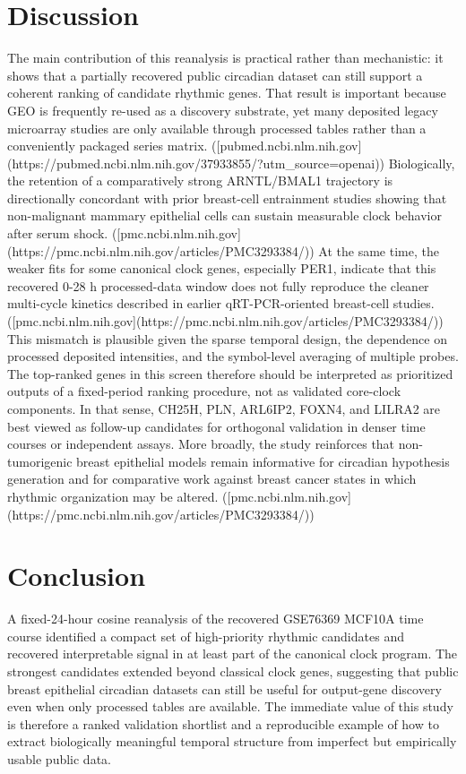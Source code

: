 \documentclass[11pt]{article}
\begin{document}
\section{Discussion}
The main contribution of this reanalysis is practical rather than mechanistic: it shows that a partially recovered public circadian dataset can still support a coherent ranking of candidate rhythmic genes. That result is important because GEO is frequently re-used as a discovery substrate, yet many deposited legacy microarray studies are only available through processed tables rather than a conveniently packaged series matrix. ([pubmed.ncbi.nlm.nih.gov](https://pubmed.ncbi.nlm.nih.gov/37933855/?utm\_source=openai)) Biologically, the retention of a comparatively strong ARNTL/BMAL1 trajectory is directionally concordant with prior breast-cell entrainment studies showing that non-malignant mammary epithelial cells can sustain measurable clock behavior after serum shock. ([pmc.ncbi.nlm.nih.gov](https://pmc.ncbi.nlm.nih.gov/articles/PMC3293384/)) At the same time, the weaker fits for some canonical clock genes, especially PER1, indicate that this recovered 0-28 h processed-data window does not fully reproduce the cleaner multi-cycle kinetics described in earlier qRT-PCR-oriented breast-cell studies. ([pmc.ncbi.nlm.nih.gov](https://pmc.ncbi.nlm.nih.gov/articles/PMC3293384/)) This mismatch is plausible given the sparse temporal design, the dependence on processed deposited intensities, and the symbol-level averaging of multiple probes. The top-ranked genes in this screen therefore should be interpreted as prioritized outputs of a fixed-period ranking procedure, not as validated core-clock components. In that sense, CH25H, PLN, ARL6IP2, FOXN4, and LILRA2 are best viewed as follow-up candidates for orthogonal validation in denser time courses or independent assays. More broadly, the study reinforces that non-tumorigenic breast epithelial models remain informative for circadian hypothesis generation and for comparative work against breast cancer states in which rhythmic organization may be altered. ([pmc.ncbi.nlm.nih.gov](https://pmc.ncbi.nlm.nih.gov/articles/PMC3293384/))

\section{Conclusion}
A fixed-24-hour cosine reanalysis of the recovered GSE76369 MCF10A time course identified a compact set of high-priority rhythmic candidates and recovered interpretable signal in at least part of the canonical clock program. The strongest candidates extended beyond classical clock genes, suggesting that public breast epithelial circadian datasets can still be useful for output-gene discovery even when only processed tables are available. The immediate value of this study is therefore a ranked validation shortlist and a reproducible example of how to extract biologically meaningful temporal structure from imperfect but empirically usable public data.
\end{document}

